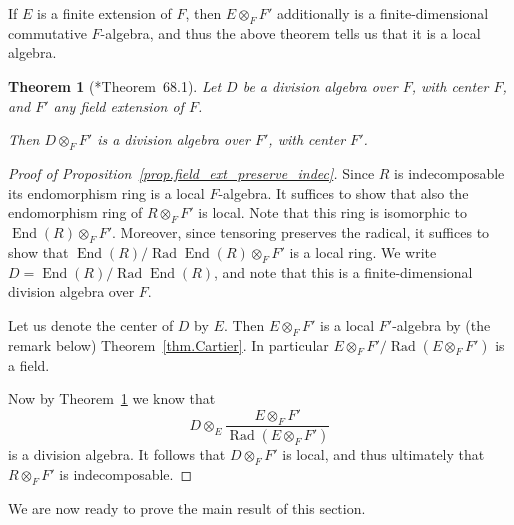 \documentclass[a4paper]{amsart}
\theoremstyle{plain}
\newtheorem{theorem}{Theorem}[section]
\theoremstyle{definition}
\theoremstyle{remark}
\DeclareMathOperator{\End}{End}
\begin{document}
If \( E \) is a finite extension of \( F \), then \( E \otimes_F F' \) additionally is a finite-dimensional commutative \( F \)-algebra, and thus the above theorem tells us that it is a local algebra.

\begin{theorem}[\cite{CurtisReiner}*{Theorem~68.1}] \label{thm.CR}
Let \( D \) be a division algebra over \( F \), with center \( F \), and \( F' \) any field extension of \( F \).

Then \( D \otimes_F F' \) is a division algebra over \( F' \), with center \( F' \).
\end{theorem} 

\begin{proof}[Proof of Proposition~\ref{prop.field_ext_preserve_indec}]
Since \( R \) is indecomposable its endomorphism ring is a local \( F \)-algebra. It suffices to show that also the endomorphism ring of \( R \otimes_F F' \) is local. Note that this ring is isomorphic to \( \End(R) \otimes_F F' \). Moreover, since tensoring preserves the radical, it suffices to show that \( \End(R) / \operatorname{Rad} \End(R) \otimes_F F' \) is a local ring. We write \( D = \End(R) / \operatorname{Rad} \End(R) \), and note that this is a finite-dimensional division algebra over \( F \).

Let us denote the center of \( D \) by \( E \). Then \( E \otimes_F F' \) is a local \( F' \)-algebra by (the remark below) Theorem~\ref{thm.Cartier}. In particular \( E \otimes_F F' / \operatorname{Rad}(E \otimes_F F') \) is a field.

Now by Theorem~\ref{thm.CR} we know that
\[ D \otimes_E \frac{E \otimes_F F'}{\operatorname{Rad}(E \otimes_F F')} \]
is a division algebra. It follows that \( D \otimes_F F' \) is local, and thus ultimately that \( R \otimes_F F' \) is indecomposable.
\end{proof}

We are now ready to prove the main result of this section.
\end{document}
